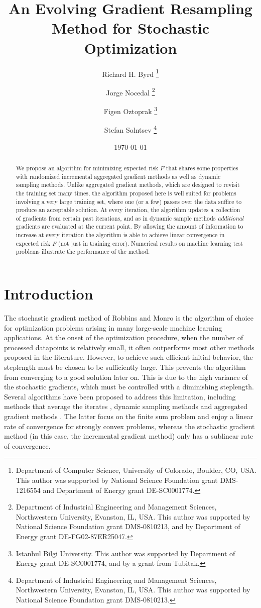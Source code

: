 \documentclass[11pt]{article}
\title{An Evolving Gradient Resampling Method for Stochastic Optimization}
\author{Richard H. Byrd 
\thanks{Department of Computer Science, University of Colorado, Boulder, CO, USA. This author was supported by National Science Foundation grant DMS-1216554 and Department of Energy grant DE-SC0001774.} 
\and Jorge Nocedal 
\thanks{Department of Industrial Engineering and Management Sciences, Northwestern University, Evanston, IL, USA. This author was supported by National Science Foundation grant DMS-0810213, and by Department of Energy grant DE-FG02-87ER25047.} 
\and Figen Oztoprak 
\thanks{Istanbul Bilgi University. This author was supported by Department of Energy grant DE-SC0001774, and by a grant from Tubitak.} 
\and Stefan Solntsev \thanks{Department of Industrial Engineering and Management Sciences, Northwestern University, Evanston, IL, USA. This author was supported by National Science Foundation grant DMS-0810213.} 
}
\date{\today}
\begin{document}
\maketitle 
\begin{abstract}
We propose an algorithm for minimizing expected risk $F$ that shares some properties with randomized  incremental aggregated gradient methods as well as  dynamic sampling methods. Unlike aggregated gradient methods, which are designed to revisit the training set many times, the algorithm proposed here is well suited for problems involving a very large training set,  where one (or a few) passes over the data suffice to produce an acceptable solution.  At every iteration, the algorithm updates  a collection of gradients  from certain past iterations, and as in dynamic sample methods \emph{additional} gradients are evaluated at the current point. By allowing the amount of information to increase at every iteration the algorithm is able to achieve  linear convergence in expected risk $F$ (not just in training error). Numerical results on machine learning test problems illustrate the performance of the method. 
\end{abstract}
 
%

\section{Introduction}

The stochastic gradient method of Robbins and Monro \cite{RobMon51} is the algorithm of choice for optimization problems arising in many large-scale machine learning applications.  At the onset of the optimization procedure, when the number of processed datapoints is relatively small, it often outperforms most other methods proposed in the literature. However, to achieve such efficient initial behavior, the steplength must be chosen to be sufficiently large. This prevents the algorithm from converging to a good solution later on. This is due to the high variance of the stochastic gradients, which must be controlled with a diminishing steplength. Several algorithms have been proposed to address this limitation, including methods that average the iterates \cite{PolJud92,ruppert1988efficient, Nesterov:09}, dynamic sampling methods \cite{dss,FS2011,2014pasglyetal} and aggregated gradient methods  \cite{roux2012stochastic,johnson2013accelerating,shalev2013stochastic,mairal2015incremental,defazio2014finito,frostig2014competing,NIPS2014_5258}.
The latter focus on the finite sum problem and enjoy a linear rate of convergence for strongly convex problems, whereas the stochastic gradient method (in this case, the incremental gradient method) only has a sublinear rate of convergence.  
\end{document}
